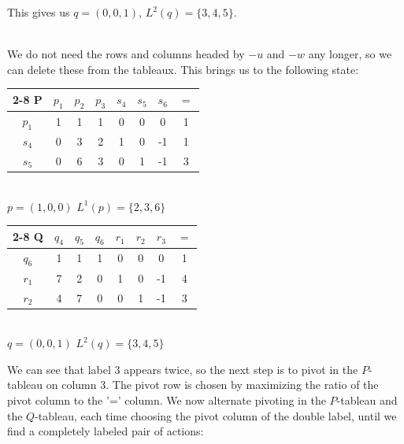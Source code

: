 \documentclass[12pt]{article}
\begin{document}
\noindent
This gives us $q = (0, 0, 1)$, $L^2(q) = \{ 3, 4, 5 \}$.

\noindent
\\
We do not need the rows and columns headed by $-u$ and $-w$ any longer, so we can delete these from the tableaux.
This brings us to the following state:

\begin{table}[h!]
    \begin{minipage}{.5\linewidth}
        \centering
        \begin{tabular}{c|ccc|ccc|c|}
            \cline{2-8}
            \textbf{P} & $p_1$ & $p_2$ & $p_3$ & $s_4$ & $s_5$ & $s_6$ & $=$ \\ \hline
            \multicolumn{1}{|c|}{$p_1$} & 1 & 1 & 1 & 0 & 0 & 0 & 1 \\
            \multicolumn{1}{|c|}{$s_4$} & 0 & 3 & 2 & 1 & 0 & -1 & 1 \\
            \multicolumn{1}{|c|}{$s_5$} & 0 & 6 & 3 & 0 & 1 & -1 & 3 \\ \hline
        \end{tabular}\\
        $p = (1, 0, 0)$ \quad $L^1(p) = \{ 2, 3, 6 \}$
    \end{minipage}%
    \begin{minipage}{.5\linewidth}
        \centering
        \begin{tabular}{c|ccc|ccc|c|}
            \cline{2-8}
            \textbf{Q} & $q_4$ & $q_5$ & $q_6$ & $r_1$ & $r_2$ & $r_3$ & $=$ \\ \hline
            \multicolumn{1}{|c|}{$q_6$} & 1 & 1 & 1 & 0 & 0 & 0 & 1 \\
            \multicolumn{1}{|c|}{$r_1$} & 7 & 2 & 0 & 1 & 0 & -1 & 4 \\
            \multicolumn{1}{|c|}{$r_2$} & 4 & 7 & 0 & 0 & 1 & -1 & 3 \\ \hline
        \end{tabular}\\
        $q = (0, 0, 1)$ \quad $L^2(q) = \{ 3, 4, 5 \}$
    \end{minipage}
\end{table}

\noindent
We can see that label 3 appears twice, so the next step is to pivot in the $P$-tableau on column 3.
The pivot row is chosen by maximizing the ratio of the pivot column to the '=' column.
We now alternate pivoting in the $P$-tableau and the $Q$-tableau, each time choosing the pivot column of the double label, until we find a completely labeled pair of actions:
\end{document}
